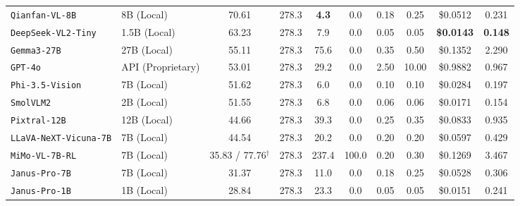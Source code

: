 \documentclass[10pt,twocolumn,letterpaper]{article}
\begin{document}
\begin{table}[t]
{\begin{tabular}{llcccccccc}
\texttt{Qianfan-VL-8B} & 8B (Local) & 70.61 & 278.3 & \textbf{4.3} & 0.0 & 0.18 & 0.25 & \$0.0512 & 0.231 \\
\texttt{DeepSeek-VL2-Tiny} & 1.5B (Local) & 63.23 & 278.3 & 7.9 & 0.0 & 0.05 & 0.05 & \textbf{\$0.0143} & \textbf{0.148} \\
\texttt{Gemma3-27B} & 27B (Local) & 55.11 & 278.3 & 75.6 & 0.0 & 0.35 & 0.50 & \$0.1352 & 2.290 \\
\texttt{GPT-4o} & API (Proprietary) & 53.01 & 278.3 & 29.2 & 0.0 & 2.50 & 10.00 & \$0.9882 & 0.967 \\
\texttt{Phi-3.5-Vision} & 7B (Local) & 51.62 & 278.3 & 6.0 & 0.0 & 0.10 & 0.10 & \$0.0284 & 0.197 \\
\texttt{SmolVLM2} & 2B (Local) & 51.55 & 278.3 & 6.8 & 0.0 & 0.06 & 0.06 & \$0.0171 & 0.154 \\
\texttt{Pixtral-12B} & 12B (Local) & 44.66 & 278.3 & 39.3 & 0.0 & 0.25 & 0.35 & \$0.0833 & 0.935 \\
\texttt{LLaVA-NeXT-Vicuna-7B} & 7B (Local) & 44.54 & 278.3 & 20.2 & 0.0 & 0.20 & 0.20 & \$0.0597 & 0.429 \\
\texttt{MiMo-VL-7B-RL} & 7B (Local) & 35.83 / 77.76$^\dagger$ & 278.3 & 237.4 & 100.0 & 0.20 & 0.30 & \$0.1269 & 3.467 \\
\texttt{Janus-Pro-7B} & 7B (Local) & 31.37 & 278.3 & 11.0 & 0.0 & 0.18 & 0.25 & \$0.0528 & 0.306 \\
\texttt{Janus-Pro-1B} & 1B (Local) & 28.84 & 278.3 & 23.3 & 0.0 & 0.05 & 0.05 & \$0.0151 & 0.241 \\
\bottomrule
\end{tabular}%
}
\end{table}
\end{document}
